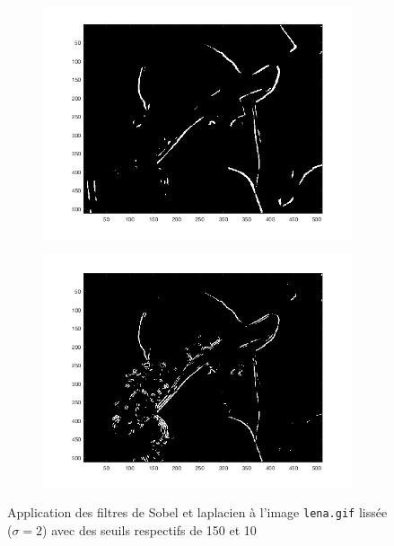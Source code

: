 \documentclass[a4paper]{article}
\begin{document}
\begin{figure}[H]
    \centering
    \begin{subfigure}[c]{0.46\textwidth}
        \centering
        \includegraphics[width=\textwidth]{images/lena_gauss_sobel3.png}
    \end{subfigure}
    \begin{subfigure}[c]{0.46\textwidth}
        \centering
        \includegraphics[width=\textwidth]{images/lena_gauss_laplacien3.png}
    \end{subfigure}
    \caption{Application des filtres de Sobel et laplacien à l'image
    \texttt{lena.gif} lissée ($\sigma=2$) avec des seuils respectifs de 150 et
    10}
    \label{fig:lena-lissage}
\end{figure}
\end{document}
